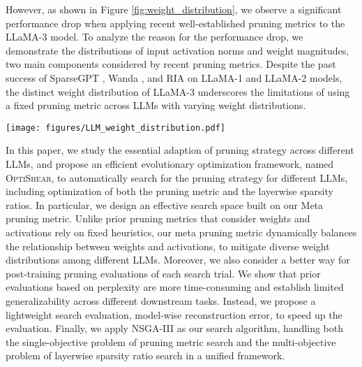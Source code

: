 However, as shown in Figure \ref{fig:weight_distribution}, we observe a significant performance drop when applying recent well-established pruning metrics \citep{frantar2023sparsegpt, sun2023simple, zhangplug} to the LLaMA-3 \citep{llama3} model. To analyze the reason for the performance drop, we demonstrate the distributions of input activation norms and weight magnitudes, two main components considered by recent pruning metrics. 
Despite the past success of SparseGPT \citep{frantar2023sparsegpt}, Wanda \citep{sun2023simple}, and RIA \citep{zhangplug} on LLaMA-1 \citep{touvron2023llama} and LLaMA-2 \citep{touvron2023llama2} models, the distinct weight distribution of LLaMA-3 underscores the limitations of using a fixed pruning metric across LLMs with varying weight distributions. 

\begin{figure*}[htbp]
  \centering
  \texttt{[image: figures/LLM\_weight\_distribution.pdf]}
  \caption{
  \textbf{Performance of existing pruning metrics on different LLMs.} Existing pruning metrics show significant performance drops on the LLaMA-3 model (bar charts in the upper part), influenced by its distinct weight distribution compared to LLaMA-1/2 and Mistral models (the lower part).
  }
  \vspace{-1em}
  \label{fig:weight_distribution}
\end{figure*}

In this paper, we study the essential adaption of pruning strategy across different LLMs, and propose an efficient evolutionary optimization framework, named \textsc{OptiShear}, to automatically search for the pruning strategy for different LLMs, including optimization of both the pruning metric and the layerwise sparsity ratios. 
In particular, we design an effective search space built on our Meta pruning metric. 
Unlike prior pruning metrics \citep{frantar2023sparsegpt, sun2023simple, zhangplug} that consider weights and activations rely on fixed heuristics, our meta pruning metric dynamically balances the relationship between weights and activations, to mitigate diverse weight distributions among different LLMs. 
Moreover, we also consider a better way for post-training pruning evaluations of each search trial. We show that prior evaluations based on perplexity \citep{dongpruner} are more time-consuming and establish limited generalizability across different downstream tasks. Instead, we propose a lightweight search evaluation, model-wise reconstruction error, to speed up the evaluation.
Finally, we apply NSGA-III \citep{deb2013evolutionary, jain2013evolutionary} as our search algorithm, handling both the single-objective problem of pruning metric search and the multi-objective problem of layerwise sparsity ratio search in a unified framework.

